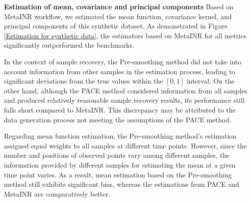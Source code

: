 \documentclass{article}
\begin{document}
\textbf{Estimation of mean, covariance and principal components}
Based on MetaINR workflow, we estimated the mean function, covariance kernel, and principal components of this synthetic dataset. 
As demonstrated in Figure \ref{Estimation for synthetic data},
the estimators based on MetaINR for all metrics significantly outperformed the benchmarks. 

In the context of sample recovery, 
the Pre-smoothing method did not take into account information from other samples in the estimation process, 
leading to significant deviations from the true values within the $[0,1]$ interval. 
On the other hand, although the PACE method considered information from all samples and produced relatively reasonable sample recovery results, 
its performance still falls short compared to MetaINR. 
This discrepancy may be attributed to the data generation process not meeting the assumptions of the PACE method.

Regarding mean function estimation, the Pre-smoothing method's estimation  assigned equal weights to all samples at different time points. 
However, since the number and positions of observed points vary among different samples, the information provided by different samples for estimating the mean at a given time point varies. 
As a result, mean estimation based on the Pre-smoothing method still exhibits significant bias, whereas the estimations from PACE and MetaINR are comparatively better.
\end{document}
